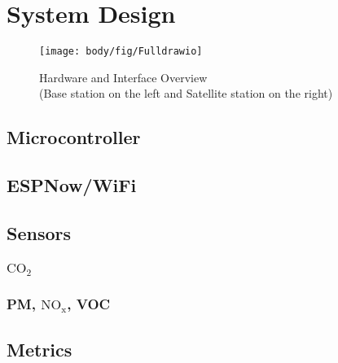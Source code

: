\chapter{System Design}



\begin{figure}[!htb]
	\centering
	\texttt{[image: body/fig/Fulldrawio]}
	\caption{Hardware and Interface Overview \\(Base station on the left and Satellite station on the right) }
	\label{fig:fulldrawio}
\end{figure}


\section{Microcontroller}

\section{ESPNow/WiFi}

\section{Sensors}
\subsection{$\mathrm{CO_2}$}
\subsection{PM, $\mathrm{NO_x}$, VOC}

\section{Metrics}
